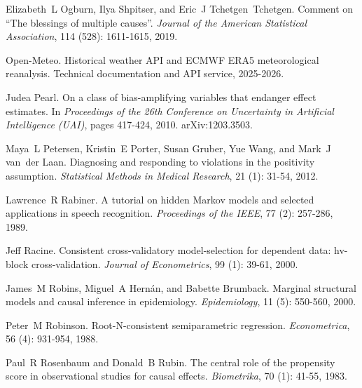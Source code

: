 Elizabeth~L Ogburn, Ilya Shpitser, and Eric~J Tchetgen~Tchetgen.
\newblock Comment on ``{T}he blessings of multiple causes''.
\newblock \emph{Journal of the American Statistical Association}, 114 (528): 1611-1615, 2019.

Open-Meteo.
\newblock Historical weather API and ECMWF ERA5 meteorological reanalysis.
\newblock Technical documentation and API service, 2025-2026.

Judea Pearl.
\newblock On a class of bias-amplifying variables that endanger effect estimates.
\newblock In \emph{Proceedings of the 26th Conference on Uncertainty in Artificial Intelligence (UAI)}, pages 417-424, 2010.
\newblock arXiv:1203.3503.

Maya~L Petersen, Kristin~E Porter, Susan Gruber, Yue Wang, and Mark~J van~der Laan.
\newblock Diagnosing and responding to violations in the positivity assumption.
\newblock \emph{Statistical Methods in Medical Research}, 21 (1): 31-54, 2012.

Lawrence~R Rabiner.
\newblock A tutorial on hidden {M}arkov models and selected applications in speech recognition.
\newblock \emph{Proceedings of the IEEE}, 77 (2): 257-286, 1989.

Jeff Racine.
\newblock Consistent cross-validatory model-selection for dependent data: hv-block cross-validation.
\newblock \emph{Journal of Econometrics}, 99 (1): 39-61, 2000.

James~M Robins, Miguel~A Hern{\'a}n, and Babette Brumback.
\newblock Marginal structural models and causal inference in epidemiology.
\newblock \emph{Epidemiology}, 11 (5): 550-560, 2000.

Peter~M Robinson.
\newblock Root-{N}-consistent semiparametric regression.
\newblock \emph{Econometrica}, 56 (4): 931-954, 1988.

Paul~R Rosenbaum and Donald~B Rubin.
\newblock The central role of the propensity score in observational studies for causal effects.
\newblock \emph{Biometrika}, 70 (1): 41-55, 1983.

